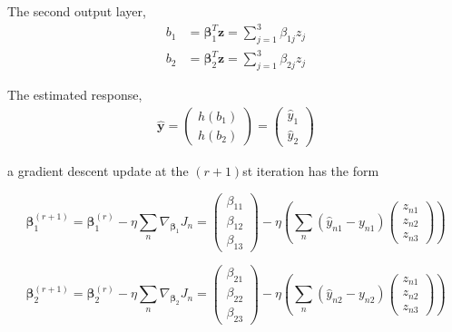 \documentclass[12pt,a4paper]{article}%
\theoremstyle{definition}
\theoremstyle{plain}
\numberwithin{equation}{section}
\begin{document}
The second output layer,
\begin{align*}
b_{1} &= \boldsymbol{\beta}_{1}^{T} \mathbf{z} = \sum\limits_{j=1}^{3} \beta_{1j}z_{j}  \\
b_{2} &= \boldsymbol{\beta}_{2}^{T} \mathbf{z} = \sum\limits_{j=1}^{3} \beta_{2j}z_{j}
\end{align*}

The estimated response,
\begin{gather*}
\mathbf{\hat{y}} = \begin{pmatrix}
  h(b_{1}) \\
  h(b_{2})
 \end{pmatrix} = \begin{pmatrix}
  \hat{y}_{1} \\
  \hat{y}_{2}
 \end{pmatrix}
\end{gather*}

a gradient descent update at the $(r+1)$st iteration has the form

\begin{equation*}
\boldsymbol{\beta}_{1}^{(r+1)} = \boldsymbol{\beta}_{1}^{(r)} - \eta \sum\limits_{n} \nabla_{\boldsymbol{\beta}_{1}} J_{n} = \begin{pmatrix}
  \beta_{11} \\
  \beta_{12} \\
  \beta_{13}
 \end{pmatrix} - \eta \left( \sum\limits_{n} (\hat{y}_{n1}-y_{n1})  \begin{pmatrix}
  z_{n1} \\
  z_{n2} \\
  z_{n3}
 \end{pmatrix} \right)
\end{equation*}

\begin{equation*}
\boldsymbol{\beta}_{2}^{(r+1)} = \boldsymbol{\beta}_{2}^{(r)} - \eta \sum\limits_{n} \nabla_{\boldsymbol{\beta}_{2}} J_{n} = \begin{pmatrix}
  \beta_{21} \\
  \beta_{22} \\
  \beta_{23}
 \end{pmatrix} - \eta \left( \sum\limits_{n} (\hat{y}_{n2}-y_{n2})  \begin{pmatrix}
  z_{n1} \\
  z_{n2} \\
  z_{n3}
 \end{pmatrix} \right)
\end{equation*}
\end{document}
